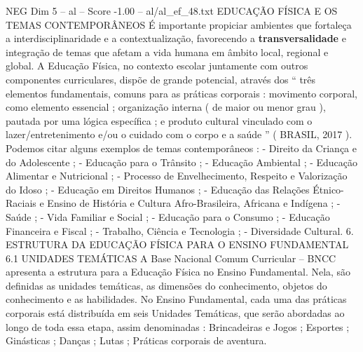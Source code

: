 \begin{textsample}{NEG Dim 5 – al – Score -1.00 – al/al\_ef\_48.txt}
EDUCAÇÃO FÍSICA E OS TEMAS CONTEMPORÂNEOS É importante propiciar ambientes que fortaleça a interdisciplinaridade e a contextualização, favorecendo a \textbf{transversalidade} e integração de temas que afetam a vida humana em âmbito local, regional e global.
A Educação Física, no contexto escolar juntamente com outros componentes curriculares, dispõe de grande potencial, através dos “ três elementos fundamentais, comuns para as práticas corporais : movimento corporal, como elemento essencial ; organização interna ( de maior ou menor grau ), pautada por uma lógica específica ; e produto cultural vinculado com o lazer/entretenimento e/ou o cuidado com o corpo e a saúde ” ( BRASIL, 2017 ).
Podemos citar alguns exemplos de temas contemporâneos : - Direito da Criança e do Adolescente ; - Educação para o Trânsito ; - Educação Ambiental ; - Educação Alimentar e Nutricional ; - Processo de Envelhecimento, Respeito e Valorização do Idoso ; - Educação em Direitos Humanos ; - Educação das Relações Étnico-Raciais e Ensino de História e Cultura Afro-Brasileira, Africana e Indígena ; - Saúde ; - Vida Familiar e Social ; - Educação para o Consumo ; - Educação Financeira e Fiscal ; - Trabalho, Ciência e Tecnologia ; - Diversidade Cultural. 6.
ESTRUTURA DA EDUCAÇÃO FÍSICA PARA O ENSINO FUNDAMENTAL 6.1 UNIDADES TEMÁTICAS A Base Nacional Comum Curricular – BNCC apresenta a estrutura para a Educação Física no Ensino Fundamental.
Nela, são definidas as unidades temáticas, as dimensões do conhecimento, objetos do conhecimento e as habilidades.
No Ensino Fundamental, cada uma das práticas corporais está distribuída em seis Unidades Temáticas, que serão abordadas ao longo de toda essa etapa, assim denominadas : Brincadeiras e Jogos ; Esportes ; Ginásticas ; Danças ; Lutas ; Práticas corporais de aventura.

\end{textsample}
